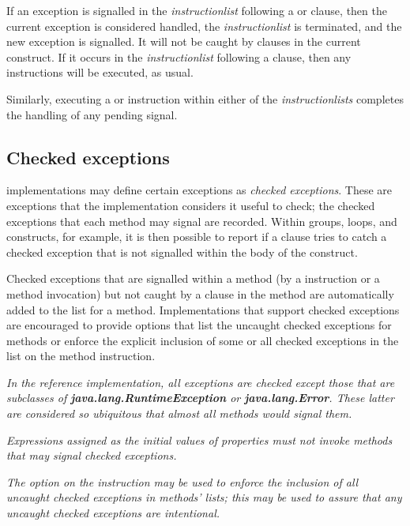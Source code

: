 If an exception is signalled in the \emph{instructionlist} following
a  or  clause, then the current exception
is considered handled, the \emph{instructionlist} is terminated, and
the new exception is signalled.  It will not be caught by 
clauses in the current construct.  If it occurs in the
\emph{instructionlist} following a  clause, then any
 instructions will be executed, as usual.
 
Similarly, executing a 
or  instruction within either of the
\emph{instructionlists} completes the handling of any pending
signal.
\subsection{Checked exceptions}\label{refchecked}
 
\nr{} implementations may define certain exceptions as \emph{checked
exceptions}.  These are exceptions that the implementation considers
it useful to check; the checked exceptions that each method may signal
are recorded.  Within  groups,  loops, and
 constructs, for example, it is then possible to report
if a  clause tries to catch a checked exception that is
not signalled within the body of the construct.
 
Checked exceptions that are signalled within a method (by a
 instruction or a method invocation) but not caught by a
 clause in the method are automatically added to the
 list for a method.  Implementations that support
checked exceptions are encouraged to provide options that list the
uncaught checked exceptions for methods or enforce the explicit
inclusion of some or all checked exceptions in the  list
on the method instruction.
 
\emph{In the reference implementation, all exceptions are checked except
those that are subclasses of \textbf{java.lang.RuntimeException}
or \textbf{java.lang.Error}.  These latter are considered so
ubiquitous that almost all methods would signal them.}
 
\emph{Expressions assigned as the initial values of properties must not invoke
methods that may signal checked exceptions.}
 
\emph{The  option on the  instruction may
be used to enforce the inclusion of all uncaught checked exceptions in
methods'  lists; this may be used to assure that
any uncaught checked exceptions are intentional.}
